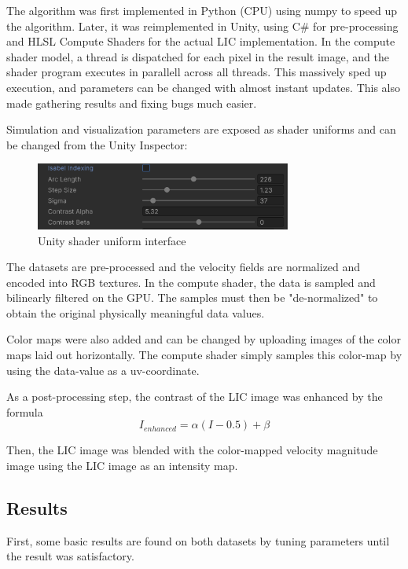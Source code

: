 \documentclass{article}
\begin{document}
The algorithm was first implemented in Python (CPU) using numpy to speed up the algorithm. Later, it was reimplemented in Unity, using C\# for pre-processing and HLSL Compute Shaders for the actual LIC implementation.
In the compute shader model, a thread is dispatched for each pixel in the result image, and the shader program executes in parallell across all threads.
This massively sped up execution, and parameters can be changed with almost instant updates. This also made gathering results and fixing bugs much easier.

Simulation and visualization parameters are exposed as shader uniforms and can be changed from the Unity Inspector:
\begin{figure}[h!]
    \centering
    \includegraphics[width=0.75\textwidth]{unity_editor.png}
    \caption{Unity shader uniform interface}
\end{figure}

The datasets are pre-processed and the velocity fields are normalized and encoded into RGB textures.
In the compute shader, the data is sampled and bilinearly filtered on the GPU. The samples must then be "de-normalized"
to obtain the original physically meaningful data values.

Color maps were also added and can be changed by uploading images of the color maps laid out horizontally.
The compute shader simply samples this color-map by using the data-value as a uv-coordinate.

As a post-processing step, the contrast of the LIC image was enhanced by the formula
$$I_{enhanced} = \alpha(I-0.5) + \beta$$

Then, the LIC image was blended with the color-mapped velocity magnitude image using the 
LIC image as an intensity map.

\newpage
\subsection{Results}
First, some basic results are found on both datasets by tuning parameters until the result
was satisfactory.
\end{document}
